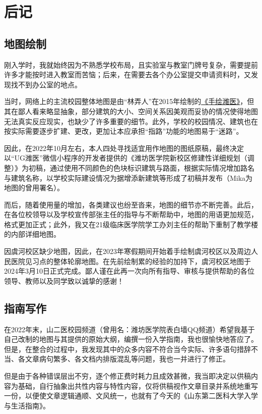 \chapter[后记]{后记}
\section[地图绘制]{地图绘制}
刚入学时，我就始终因为不熟悉学校布局，且实验室与教室门牌号复杂，需要提前许多才能按时进入教室而苦恼；后来，在需要去各个办公室提交申请资料时，又发现找不到办公室的地点。

当时，网络上的主流校园整体地图是由“林弄人”在2015年绘制的\uline{\href{https://www.zcool.com.cn/work/ZMTgxMDQwMjg=.html}{《手绘潍医》}}，但其在鄙人看来略显抽象，部分建筑的大小、空间关系因美观而妥协的情况使得地图无法真实反应现实，也缺少了许多重要的细节。此外，学校的校园情况、建筑也在按实际需要逐步扩建、更改，更加让本应承担“指路”功能的地图易于“迷路”。

因此，在2022年10月左右，本人四处寻找适宜用作地图的图纸原稿，最终决定以“UG潍医”微信小程序的开发者提供的《潍坊医学院新校区修建性详细规划（调整）》为初稿，通过使用不同颜色的色块标识建筑与路面，根据实际情况增加路名与建筑名称，以学校实际建设情况为据增添新建筑等形成了初稿并发布（Mika为地图的曾用署名）。

而后，随着使用量的增加，各类建议也纷至沓来，地图的细节亦不断完善。此后，在各位校领导以及学校宣传部张主任的指导与不断帮助中，地图的用语更加规范，格式更加正式；此外，我又在21级临床医学院学工办刘主任的帮助下重制了教学楼的内部详细地图。

因虞河校区缺少地图，因此，在2023年寒假期间开始着手绘制虞河校区以及周边人民医院见习点的整体轮廓地图。在先前绘制累的经验的加持下，虞河校区地图于2024年3月10日正式完成。鄙人谨在此再一次向所有指导、审核与提供帮助的各位领导、教师以及同学致以诚挚的感谢！

\section[指南写作]{指南写作}

在2022年末，山二医校园频道（曾用名：潍坊医学院表白墙QQ频道）希望我基于自己改制的地图与其提供的原始大纲，编撰一份入学指南，我也很愉快地答应了。但是，在整合的过程中，我发现其中的众多内容不符合当今实际、许多语句措辞不当、各文章病句繁多、各文档内排版混乱等问题，我也一并进行了修正。

但是由于各种错误层出不穷，逐个修正费时耗力且成效甚微，我当即决定以供稿内容为基础，自行抽象出共性内容与特性内容，仅将供稿视作文章目录并系统地重写一份，以便使文章逻辑通顺、文风统一，也就有了今天的《山东第二医科大学入学与生活指南》。

